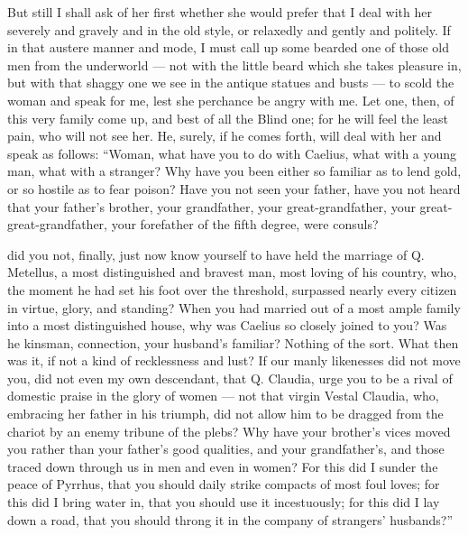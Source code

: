  But still I shall ask of her first whether she would prefer that I deal with her severely and gravely and in the old style, or relaxedly and gently and politely. If in that austere manner and mode, I must call up some bearded one of those old men from the underworld --- not with the little beard which she takes pleasure in, but with that shaggy one we see in the antique statues and busts --- to scold the woman and speak for me, lest she perchance be angry with me. Let one, then, of this very family come up, and best of all the Blind one; for he will feel the least pain, who will not see her. He, surely, if he comes forth, will deal with her and speak as follows: ``Woman, what have you to do with Caelius, what with a young man, what with a stranger? Why have you been either so familiar as to lend gold, or so hostile as to fear poison? Have you not seen your father, have you not heard that your father's brother, your grandfather, your great-grandfather, your great-great-grandfather, your forefather of the fifth degree, were consuls?

 did you not, finally, just now know yourself to have held the marriage of Q. Metellus, a most distinguished and bravest man, most loving of his country, who, the moment he had set his foot over the threshold, surpassed nearly every citizen in virtue, glory, and standing? When you had married out of a most ample family into a most distinguished house, why was Caelius so closely joined to you? Was he kinsman, connection, your husband's familiar? Nothing of the sort. What then was it, if not a kind of recklessness and lust? If our manly likenesses did not move you, did not even my own descendant, that Q. Claudia, urge you to be a rival of domestic praise in the glory of women --- not that virgin Vestal Claudia, who, embracing her father in his triumph, did not allow him to be dragged from the chariot by an enemy tribune of the plebs? Why have your brother's vices moved you rather than your father's good qualities, and your grandfather's, and those traced down through us in men and even in women? For this did I sunder the peace of Pyrrhus, that you should daily strike compacts of most foul loves; for this did I bring water in, that you should use it incestuously; for this did I lay down a road, that you should throng it in the company of strangers' husbands?''


